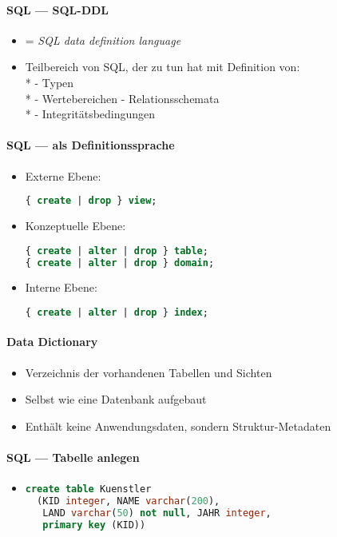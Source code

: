 \paragraph{SQL --- SQL-DDL}
\begin{itemize}
	\item = \emph{SQL data definition language}
	\item Teilbereich von SQL, der zu tun hat mit Definition von: \\*
		- Typen \\*
		- Wertebereichen
		- Relationsschemata \\*
		- Integritätsbedingungen
\end{itemize}

\paragraph{SQL --- als Definitionssprache}
\begin{itemize}
	\item Externe Ebene: 
		\begin{lstlisting}[language=sql]
{ create | drop } view;
		\end{lstlisting}
	\item Konzeptuelle Ebene:
		\begin{lstlisting}[language=sql]
{ create | alter | drop } table;
{ create | alter | drop } domain;
		\end{lstlisting}
	\item Interne Ebene:
			\begin{lstlisting}[language=sql]
{ create | alter | drop } index;
		\end{lstlisting}
\end{itemize}

\paragraph{Data Dictionary}
\begin{itemize}
	\item Verzeichnis der vorhandenen Tabellen und Sichten
	\item Selbst wie eine Datenbank aufgebaut
	\item Enthält keine Anwendungsdaten, sondern Struktur-Metadaten
\end{itemize}

\paragraph{SQL --- Tabelle anlegen}
\begin{itemize}
	\item \begin{lstlisting}[language=sql]
create table Kuenstler
  (KID integer, NAME varchar(200), 
   LAND varchar(50) not null, JAHR integer, 
   primary key (KID))
\end{lstlisting}
\end{itemize}

